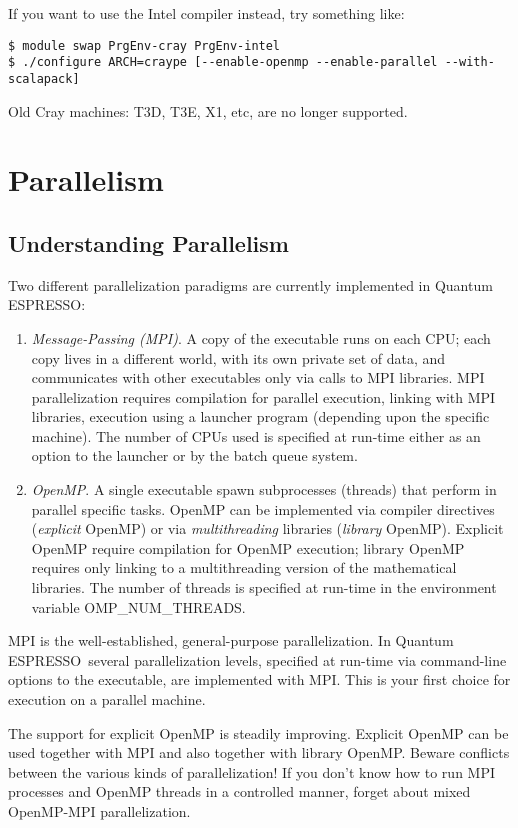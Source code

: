 \documentclass[12pt,a4paper]{article}
\def\qe{{\sc Quantum ESPRESSO}}
\begin{document}
If you want to use the Intel compiler instead, try something like:
\begin{verbatim}
$ module swap PrgEnv-cray PrgEnv-intel
$ ./configure ARCH=craype [--enable-openmp --enable-parallel --with-scalapack]
\end{verbatim}

Old Cray machines: T3D, T3E, X1, etc, are no longer supported.

\newpage

\section{Parallelism}
\label{Sec:para}

\subsection{Understanding Parallelism}

Two different parallelization paradigms are currently implemented
in \qe:
\begin{enumerate}
\item {\em Message-Passing (MPI)}. A copy of the executable runs
on each CPU; each copy lives in a different world, with its own
private set of data, and communicates with other executables only
via calls to MPI libraries. MPI parallelization requires compilation
for parallel execution, linking with MPI libraries, execution using
a launcher program (depending upon the specific machine). The number
of CPUs used
is specified at run-time either as an option to the launcher or
by the batch queue system.
\item {\em OpenMP}.  A single executable spawn subprocesses
(threads) that perform in parallel specific tasks.
OpenMP can be implemented via compiler directives ({\em explicit}
OpenMP) or via {\em multithreading} libraries  ({\em library} OpenMP).
Explicit OpenMP require compilation for OpenMP execution;
library OpenMP requires only linking to a multithreading
version of the mathematical libraries.
The number of threads is specified at run-time in the environment
variable OMP\_NUM\_THREADS.
\end{enumerate}

MPI is the well-established, general-purpose parallelization.
In \qe\ several parallelization levels, specified at run-time
via command-line options to the executable, are implemented
with MPI. This is your first choice for execution on a parallel
machine.

The support for explicit OpenMP is steadily improving.
Explicit OpenMP can be used together with MPI and also
together with library OpenMP. Beware
conflicts between the various kinds of parallelization!
If you don't know how to run MPI processes
and OpenMP threads in a controlled manner, forget about mixed
OpenMP-MPI parallelization.
\end{document}
